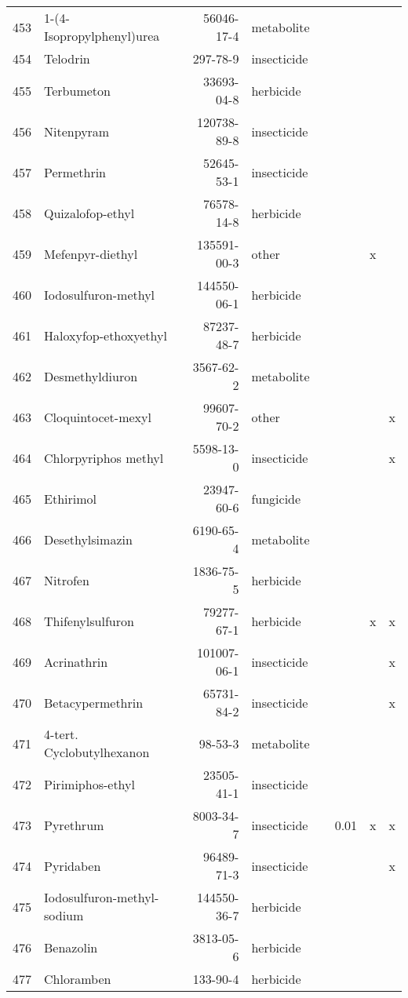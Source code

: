 \begin{longtable}{lp{4cm}rlp{1cm}p{1.5cm}p{1.5cm}p{1cm}}
  453 & 1-(4-Isopropylphenyl)urea & 56046-17-4 & metabolite &  &  &  &  \\ 
  454 & Telodrin & 297-78-9 & insecticide &  &  &  &  \\ 
  455 & Terbumeton & 33693-04-8 & herbicide &  &  &  &  \\ 
  456 & Nitenpyram & 120738-89-8 & insecticide &  &  &  &  \\ 
  457 & Permethrin & 52645-53-1 & insecticide &  &  &  &  \\ 
  458 & Quizalofop-ethyl & 76578-14-8 & herbicide &  &  &  &  \\ 
  459 & Mefenpyr-diethyl & 135591-00-3 & other &  &  & x &  \\ 
  460 & Iodosulfuron-methyl & 144550-06-1 & herbicide &  &  &  &  \\ 
  461 & Haloxyfop-ethoxyethyl & 87237-48-7 & herbicide &  &  &  &  \\ 
  462 & Desmethyldiuron & 3567-62-2 & metabolite &  &  &  &  \\ 
  463 & Cloquintocet-mexyl & 99607-70-2 & other &  &  &  & x \\ 
  464 & Chlorpyriphos methyl & 5598-13-0 & insecticide &  &  &  & x \\ 
  465 & Ethirimol & 23947-60-6 & fungicide &  &  &  &  \\ 
  466 & Desethylsimazin & 6190-65-4 & metabolite &  &  &  &  \\ 
  467 & Nitrofen & 1836-75-5 & herbicide &  &  &  &  \\ 
  468 & Thifenylsulfuron & 79277-67-1 & herbicide &  &  & x & x \\ 
  469 & Acrinathrin & 101007-06-1 & insecticide &  &  &  & x \\ 
  470 & Betacypermethrin & 65731-84-2 & insecticide &  &  &  & x \\ 
  471 & 4-tert. Cyclobutylhexanon & 98-53-3 & metabolite &  &  &  &  \\ 
  472 & Pirimiphos-ethyl & 23505-41-1 & insecticide &  &  &  &  \\ 
  473 & Pyrethrum & 8003-34-7 & insecticide &  & 0.01 & x & x \\ 
  474 & Pyridaben & 96489-71-3 & insecticide &  &  &  & x \\ 
  475 & Iodosulfuron-methyl-sodium & 144550-36-7 & herbicide &  &  &  &  \\ 
  476 & Benazolin & 3813-05-6 & herbicide &  &  &  &  \\ 
  477 & Chloramben & 133-90-4 & herbicide &  &  &  &  \\ 

\end{longtable}
